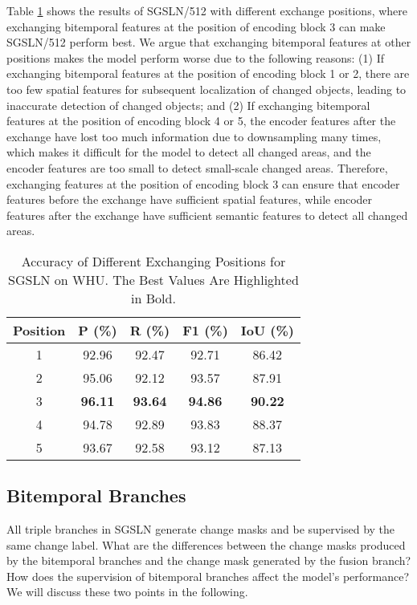 \documentclass[journal]{IEEEtran}
\begin{document}
Table \ref{exchanging_comparsion} shows the results of SGSLN/512 with different exchange positions, where exchanging bitemporal features at the position of encoding block 3 can make SGSLN/512 perform best. We argue that exchanging bitemporal features at other positions makes the model perform worse due to the following reasons: (1) If exchanging bitemporal features at the position of encoding block 1 or 2, there are too few spatial features for subsequent localization of changed objects, leading to inaccurate detection of changed objects; and (2) If exchanging bitemporal features at the position of encoding block 4 or 5, the encoder features after the exchange have lost too much information due to downsampling many times, which makes it difficult for the model to detect all changed areas, and the encoder features are too small to detect small-scale changed areas. Therefore, exchanging features at the position of encoding block 3 can ensure that encoder features before the exchange have sufficient spatial features, while encoder features after the exchange have sufficient semantic features to detect all changed areas.

\begin{table}[ht!]
\caption{Accuracy of Different Exchanging Positions for SGSLN on WHU. The Best Values Are Highlighted in Bold.}
\label{exchanging_comparsion}
\centering
\begin{tabular}{ccccc}
\toprule
Position & P (\%) & R (\%) & F1 (\%) & IoU (\%) \\
\midrule
1 & 92.96 & 92.47 & 92.71 & 86.42 \\
2 & 95.06 & 92.12 & 93.57 & 87.91 \\
3 & \textbf{96.11} & \textbf{93.64} & \textbf{94.86} & \textbf{90.22} \\
4 & 94.78 & 92.89 & 93.83 & 88.37 \\
5 & 93.67 & 92.58 & 93.12 & 87.13 \\
\bottomrule
\end{tabular}
\end{table}

\subsection{Bitemporal Branches}

All triple branches in SGSLN generate change masks and be supervised by the same change label. What are the differences between the change masks produced by the bitemporal branches and the change mask generated by the fusion branch? How does the supervision of bitemporal branches affect the model's performance? We will discuss these two points in the following.
\end{document}
